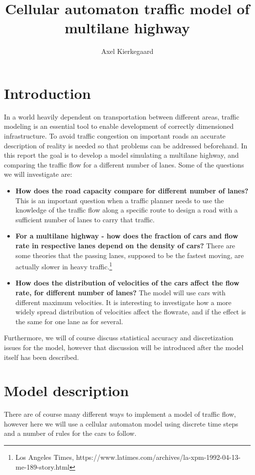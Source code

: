 \documentclass[a4paper,12pt]{article}
\title{Cellular automaton traffic model of multilane highway}
\author{Axel Kierkegaard}
\begin{document}
\maketitle

\section*{Introduction}
In a world heavily dependent on transportation between different areas, traffic modeling is an essential tool to enable development of correctly dimensioned infrastructure. To avoid traffic congestion on important roads an accurate description of reality is needed so that problems can be addressed beforehand. In this report the goal is to develop a model simulating a multilane highway, and comparing the traffic flow for a different number of lanes. Some of the questions we will investigate are:

\begin{itemize}
  \item \textbf{How does the road capacity compare for different number of lanes?}
  This is an important question when a traffic planner needs to use the knowledge of the traffic flow along a specific route to design a road with a sufficient number of lanes to carry that traffic.
  \item \textbf{For a multilane highway - how does the fraction of cars and flow rate in respective lanes depend on the density of cars?} There are some theories that the passing lanes, supposed to be the fastest moving, are actually slower in heavy traffic.\footnote{Los Angeles Times, https://www.latimes.com/archives/la-xpm-1992-04-13-me-189-story.html}
  \item \textbf{How does the distribution of velocities of the cars affect the flow rate, for different number of lanes?} The model will use cars with different maximum velocities. It is interesting to investigate how a more widely spread distribution of velocities affect the flowrate, and if the effect is the same for one lane as for several.
\end{itemize}

Furthermore, we will of course discuss statistical accuracy and discretization issues for the model, however that discussion will be introduced after the model itself has been described.

\section*{Model description}
There are of course many different ways to implement a model of traffic flow, however here we will use a cellular automaton model using discrete time steps and a number of rules for the cars to follow. 
\end{document}
